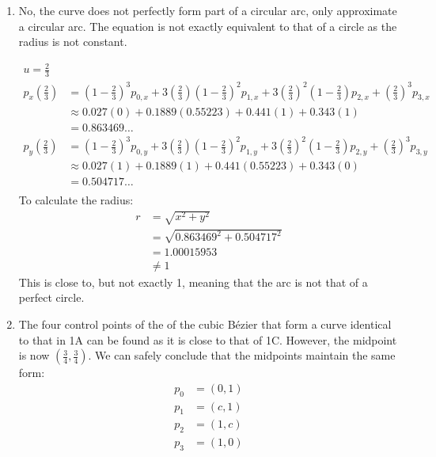 \documentclass[12p]{article}
\theoremstyle{definition}
\begin{document}
\begin{enumerate}[label=\Alph*)]
  \item No, the curve does not perfectly form part of a circular arc, only approximate a circular arc. The equation is not exactly
  equivalent to that of a circle as the radius is not constant.

  \begin{align*}
    u = \frac{2}{3}\\
    p_x(\frac{2}{3}) &= (1 - \frac{2}{3})^3 p_{0,x} + 3(\frac{2}{3})(1 - \frac{2}{3})^2 p_{1,x} + 3 (\frac{2}{3})^2(1 - \frac{2}{3}) p_{2, x} + (\frac{2}{3})^3 p_{3, x} \\
    &\approx 0.027(0) + 0.1889 (0.55223) + 0.441(1) + 0.343 (1)\\
    &= 0.863469 \dots \\
    p_y(\frac{2}{3}) &= (1 - \frac{2}{3})^3 p_{0,y} + 3(\frac{2}{3})(1 - \frac{2}{3})^2 p_{1,y} + 3 (\frac{2}{3})^2(1 - \frac{2}{3}) p_{2, y} + (\frac{2}{3})^3 p_{3, y} \\
    &\approx 0.027(1) + 0.1889 (1) + 0.441(0.55223) + 0.343 (0)\\
    &= 0.504717 \dots \\
  \end{align*}
  To calculate the radius:
  \begin{align*}
    r &= \sqrt{x^2 + y^2} \\
    &= \sqrt{0.863469^2 + 0.504717^2} \\
    &= 1.00015953 \\
    & \neq 1
  \end{align*}
  This is close to, but not exactly 1, meaning that the arc is not that of a perfect
  circle.
  \item
    The four control points of the of the cubic B\'ezier that form a curve
    identical to that in 1A can be found as it is close to that of 1C. However,
    the midpoint is now $(\frac{3}{4}, \frac{3}{4})$. We can safely conclude
    that the midpoints maintain the same form:
    \begin{align*}
      p_0 &= (0, 1) \\
      p_1 &= (c, 1) \\
      p_2 &= (1, c) \\
      p_3 &= (1, 0)
    \end{align*}

\end{enumerate}
\end{document}
